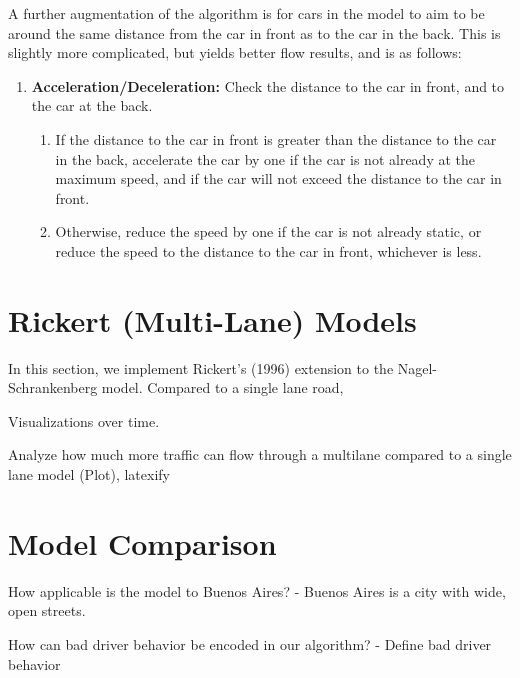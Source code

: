 \documentclass{article}
\begin{document}
A further augmentation of the algorithm is for cars in the model to aim to be around the same distance from the car in front as to the car in the back. This is slightly more complicated, but yields better flow results, and is as follows:
\begin{enumerate}[itemsep=0.1pt]
\item \textbf{Acceleration/Deceleration:} Check the distance to the car in front, and to the car at the back. \begin{enumerate}
\item If the distance to the car in front is greater than the distance to the car in the back, accelerate the car by one if the car is not already at the maximum speed, and if the car will not exceed the distance to the car in front.
\item Otherwise, reduce the speed by one if the car is not already static, or reduce the speed to the distance to the car in front, whichever is less.
\end{enumerate}

\end{enumerate}





\section*{Rickert (Multi-Lane) Models}

In this section, we implement Rickert's (1996) extension to the Nagel-Schrankenberg model. Compared to a single lane road, 

Visualizations over time. 

Analyze how much more traffic can flow through a multilane compared to a single lane model (Plot), latexify
\section*{Model Comparison}


How applicable is the model to Buenos Aires?
- Buenos Aires is a city with wide, open streets. 

How can bad driver behavior be encoded in our algorithm?
- Define bad driver behavior
\end{document}
